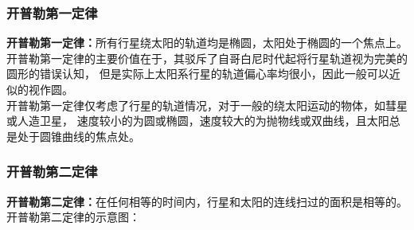 \documentclass[UTF8]{ctexart}
\begin{document}
\subsubsection{开普勒第一定律}
    \textbf{开普勒第一定律：}所有行星绕太阳的轨道均是椭圆，太阳处于椭圆的一个焦点上。\\[3mm]
    开普勒第一定律的主要价值在于，其驳斥了自哥白尼时代起将行星轨道视为完美的圆形的错误认知，
    但是实际上太阳系行星的轨道偏心率均很小，因此一般可以近似的视作圆。\\[3mm]
    开普勒第一定律仅考虑了行星的轨道情况，对于一般的绕太阳运动的物体，如彗星或人造卫星，
    速度较小的为圆或椭圆，速度较大的为抛物线或双曲线，且太阳总是处于圆锥曲线的焦点处。

\subsubsection{开普勒第二定律}
    \textbf{开普勒第二定律：}在任何相等的时间内，行星和太阳的连线扫过的面积是相等的。\\[3mm]
    开普勒第二定律的示意图：
\end{document}
